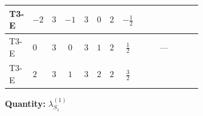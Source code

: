 \documentclass[8pt]{article}
\begin{document}
\begin{landscape}
\begin{longtable}{@{}llcccccc >{\raggedright\arraybackslash}p{0.21\linewidth} >{\raggedright\arraybackslash}p{0.21\linewidth} >{\raggedright\arraybackslash}p{0.21\linewidth}@{}}
\midrule
T3-E & $-2$ & $3$ & $-1$ & $3$ & $0$ & $2$ & $-\frac{1}{2}$ & \scriptsize\adjustbox{max width=\linewidth}{$\begin{gathered} +21 {g_2}^4\end{gathered}$} & \scriptsize\adjustbox{max width=\linewidth}{$\begin{gathered} +{g_1}^2 \left(12 {g_2}^2-12 {\lambda_{S_1}^{(1)}}-6 {\lambda_{S_1}^{(A)}}\right)\end{gathered}$} & \scriptsize\adjustbox{max width=\linewidth}{$\begin{gathered} +{g_2}^2 (-24 {\lambda_{S_1}^{(1)}}-12 {\lambda_{S_1}^{(A)}})\end{gathered}$} \\
\midrule
T3-E & $0$ & $3$ & $0$ & $3$ & $1$ & $2$ & $\frac{1}{2}$ & \scriptsize\adjustbox{max width=\linewidth}{$\begin{gathered} +21 {g_2}^4\end{gathered}$} & --- & \scriptsize\adjustbox{max width=\linewidth}{$\begin{gathered} +{g_2}^2 (-24 {\lambda_{S_1}^{(1)}}-12 {\lambda_{S_1}^{(A)}})\end{gathered}$} \\
\midrule
T3-E & $2$ & $3$ & $1$ & $3$ & $2$ & $2$ & $\frac{3}{2}$ & \scriptsize\adjustbox{max width=\linewidth}{$\begin{gathered} +21 {g_2}^4\end{gathered}$} & \scriptsize\adjustbox{max width=\linewidth}{$\begin{gathered} +{g_1}^2 \left(12 {g_2}^2-12 {\lambda_{S_1}^{(1)}}-6 {\lambda_{S_1}^{(A)}}\right)\end{gathered}$} & \scriptsize\adjustbox{max width=\linewidth}{$\begin{gathered} +{g_2}^2 (-24 {\lambda_{S_1}^{(1)}}-12 {\lambda_{S_1}^{(A)}})\end{gathered}$} \\
\midrule
\bottomrule
\end{longtable}
\clearpage
\noindent\textbf{Quantity: }$\lambda_{S_1}^{(1)}$\par\smallskip

\end{landscape}
\end{document}
